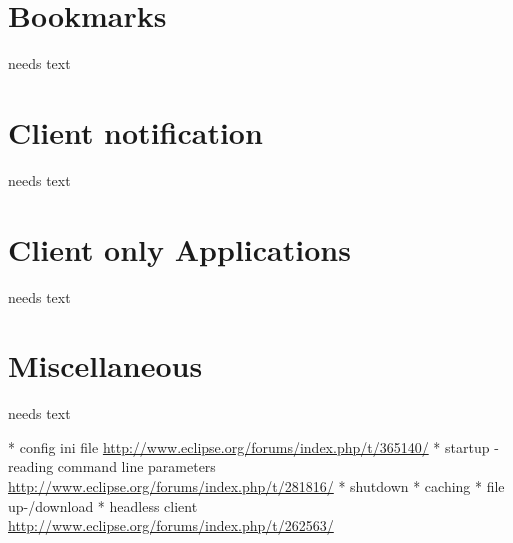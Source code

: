 \documentclass[a4paper,10pt,twoside]{book}
\begin{document}
\section{Bookmarks}
needs text
  
\section{Client notification}
needs text
    
\section{Client only Applications}
needs text
  
\section{Miscellaneous}
needs text

  * config ini file \url{http://www.eclipse.org/forums/index.php/t/365140/}
  * startup
  - reading command line parameters \url{http://www.eclipse.org/forums/index.php/t/281816/}
  * shutdown
  * caching
  * file up-/download
  * headless client \url{http://www.eclipse.org/forums/index.php/t/262563/}
  

\ifx\wholebook\relax\else
   
   
\end{document}
